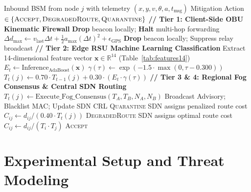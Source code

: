 \documentclass[conference]{IEEEtran}
\begin{document}
\begin{algorithm}[t]
\caption{EdgeTrust-VANET Multi-Tier Decision Workflow}
\label{alg:edgetrust}
\footnotesize
\begin{algorithmic}[1]
\REQUIRE Inbound BSM from node $j$ with telemetry $(x,y,v,\theta,a,t_{\text{msg}})$
\ENSURE Mitigation Action $\in \{\textsc{Accept}, \textsc{DegradedRoute}, \textsc{Quarantine}\}$
\STATE \textbf{// Tier 1: Client-Side OBU Kinematic Firewall}
    \STATE \textbf{Drop} beacon locally; \textbf{Halt} multi-hop forwarding
\ENDIF
\STATE $\Delta d_{\text{max}} \leftarrow v_{\text{last}}\Delta t + \frac{1}{2}a_{\text{max}}(\Delta t)^2 + \epsilon_{\text{GPS}}$
    \STATE \textbf{Drop} beacon locally; Suppress relay broadcast
\ENDIF
\STATE \textbf{// Tier 2: Edge RSU Machine Learning Classification}
    \STATE Extract 14-dimensional feature vector $\mathbf{x} \in \mathbb{R}^{14}$ (Table~\ref{tab:features14})
    \STATE $E_t \leftarrow \text{Inference}_{\text{AdaBoost}}(\mathbf{x})$ 
\ENDIF
\STATE $\gamma(\tau) \leftarrow \exp\left(-1.5 \cdot \max(0, \tau - 0.300)\right)$ 
\STATE $T_t(j) \leftarrow 0.70 \cdot T_{t-1}(j) + 0.30 \cdot (E_t \cdot \gamma(\tau))$
\STATE \textbf{// Tier 3 \& 4: Regional Fog Consensus \& Central SDN Routing}
    \STATE $T_t(j) \leftarrow \text{Execute\_Fog\_Consensus}(T_A, T_B, N_A, N_B)$
\ENDIF
{}
    \STATE Broadcast Advisory; Blacklist MAC; Update SDN CRL
    \RETURN \textsc{Quarantine}
    \STATE SDN assigns penalized route cost $C_{ij} \leftarrow d_{ij} / (0.40 \cdot T_t(j))$
    \RETURN \textsc{DegradedRoute}
\ELSE
    \STATE SDN assigns optimal route cost $C_{ij} \leftarrow d_{ij} / (T_i \cdot T_j)$
    \RETURN \textsc{Accept}
\ENDIF
\end{algorithmic}
\end{algorithm}


\section{Experimental Setup and Threat Modeling}
\end{document}
